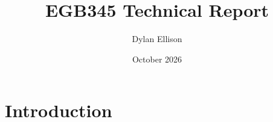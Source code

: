 \documentclass{article}
\title{EGB345 Technical Report}
\author{Dylan Ellison}
\date{October 2026}
\begin{document}
\maketitle

\section{Introduction}
\end{document}
